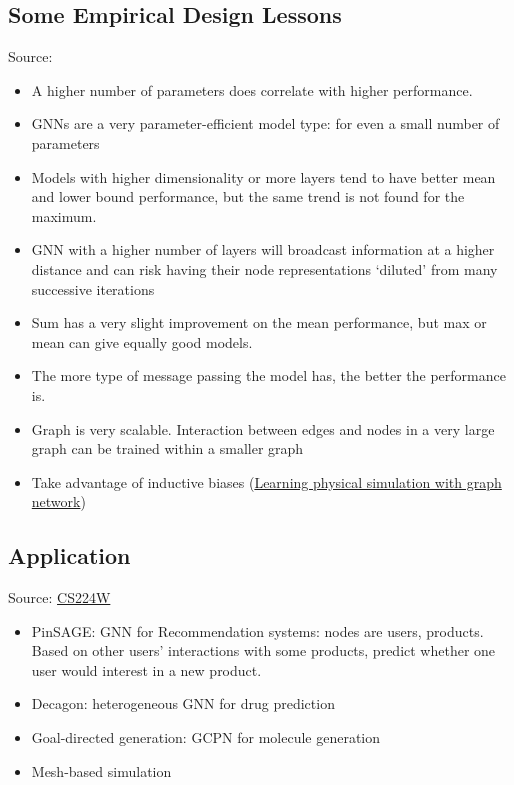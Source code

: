 \subsection{Some Empirical Design Lessons}
Source: 
\begin{itemize}
	\item A higher number of parameters does correlate with higher performance.
	\item \ac{GNN}s are a very parameter-efficient model type: for even a small number of parameters
	\item Models with higher dimensionality or more layers tend to have better mean and lower bound performance, but the same trend is not found for the maximum.
	\item \ac{GNN} with a higher number of layers will broadcast information at a higher distance and can risk having their node representations ‘diluted’ from many successive iterations
	\item Sum has a very slight improvement on the mean performance, but max or mean can give equally good models.
	\item The more type of message passing the model has, the better the performance is.
\end{itemize}

\note
\begin{itemize}
	\item Graph is very scalable. Interaction between edges and nodes in a very large graph can be trained within a smaller graph \cite{pfaff2020learning}
	\item Take advantage of inductive biases (\href{https://youtu.be/dtPcqEnLvqc}{Learning physical simulation with graph network})
\end{itemize}

\subsection{Application}
Source: \href{https://youtu.be/p2aqXKfRXEA}{CS224W}
\begin{itemize}
	\item PinSAGE: \ac{GNN} for Recommendation systems: nodes are users, products. Based on other users' interactions with some products, predict whether one user would interest in a new product.
	\item Decagon: heterogeneous \ac{GNN} for drug prediction
	\item Goal-directed generation: GCPN for molecule generation
	\item Mesh-based simulation \cite{pfaff2020learning}
\end{itemize}

